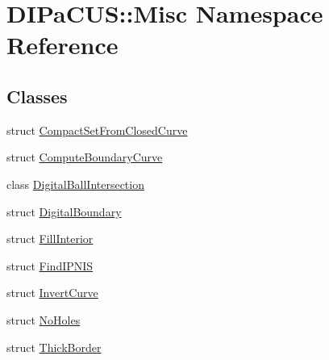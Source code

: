 \hypertarget{namespaceDIPaCUS_1_1Misc}{}\section{D\+I\+Pa\+C\+US\+:\+:Misc Namespace Reference}
\label{namespaceDIPaCUS_1_1Misc}
\subsection*{Classes}
\begin{DoxyCompactItemize}
\item 
struct \hyperlink{structDIPaCUS_1_1Misc_1_1CompactSetFromClosedCurve}{Compact\+Set\+From\+Closed\+Curve}
\item 
struct \hyperlink{structDIPaCUS_1_1Misc_1_1ComputeBoundaryCurve}{Compute\+Boundary\+Curve}
\item 
class \hyperlink{classDIPaCUS_1_1Misc_1_1DigitalBallIntersection}{Digital\+Ball\+Intersection}
\item 
struct \hyperlink{structDIPaCUS_1_1Misc_1_1DigitalBoundary}{Digital\+Boundary}
\item 
struct \hyperlink{structDIPaCUS_1_1Misc_1_1FillInterior}{Fill\+Interior}
\item 
struct \hyperlink{structDIPaCUS_1_1Misc_1_1FindIPNIS}{Find\+I\+P\+N\+IS}
\item 
struct \hyperlink{structDIPaCUS_1_1Misc_1_1InvertCurve}{Invert\+Curve}
\item 
struct \hyperlink{structDIPaCUS_1_1Misc_1_1NoHoles}{No\+Holes}
\item 
struct \hyperlink{structDIPaCUS_1_1Misc_1_1ThickBorder}{Thick\+Border}
\end{DoxyCompactItemize}
